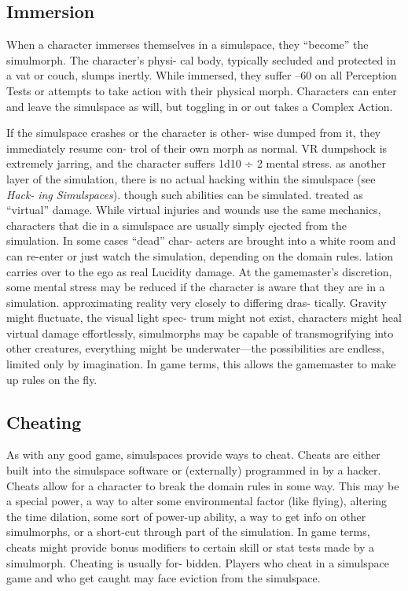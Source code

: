 \subsection{Immersion}

When a character immerses themselves in a simulspace, 
they ``become'' the simulmorph. The character's physi-
cal body, typically secluded and protected in a vat or 
couch, slumps inertly. While immersed, they suffer –60 
on all Perception Tests or attempts to take action with 
their physical morph. Characters can enter and leave 
the simulspace as will, but toggling in or out takes a 
Complex Action.

If the simulspace crashes or the character is other-
wise dumped from it, they immediately resume con-
trol of their own morph as normal. VR dumpshock is 
extremely jarring, and the character suffers 1d10 ÷ 2 
mental stress.
as another layer of the simulation, there is no 
actual hacking within the simulspace (see \textit{Hack-}
\textit{ing Simulspaces}).
though such abilities can be simulated.
treated as ``virtual'' damage. While virtual injuries 
and wounds use the same mechanics, characters 
that die in a simulspace are usually simply ejected 
from the simulation. In some cases ``dead'' char-
acters are brought into a white room and can 
re-enter or just watch the simulation, depending 
on the domain rules.
lation carries over to the ego as real Lucidity 
damage. At the gamemaster's discretion, some 
mental stress may be reduced if the character is 
aware that they are in a simulation.
approximating reality very closely to differing dras-
tically. Gravity might fluctuate, the visual light spec-
trum might not exist, characters might heal virtual 
damage effortlessly, simulmorphs may be capable of 
transmogrifying into other creatures, everything might 
be underwater—the possibilities are endless, limited 
only by imagination. In game terms, this allows the 
gamemaster to make up rules on the fly.

\subsection{Cheating}

As with any good game, simulspaces provide ways 
to cheat. Cheats are either built into the simulspace 
software or (externally) programmed in by a hacker. 
Cheats allow for a character to break the domain rules 
in some way. This may be a special power, a way to 
alter some environmental factor (like flying), altering 
the time dilation, some sort of power-up ability, a 
way to get info on other simulmorphs, or a short-cut 
through part of the simulation. In game terms, cheats 
might provide bonus modifiers to certain skill or stat 
tests made by a simulmorph. Cheating is usually for-
bidden. Players who cheat in a simulspace game and 
who get caught may face eviction from the simulspace.

